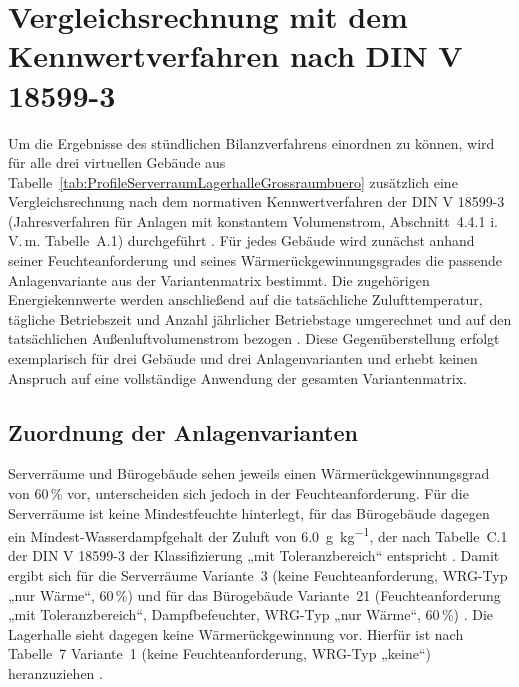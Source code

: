 \documentclass{scrreprt}
\begin{document}
\section{Vergleichsrechnung mit dem Kennwertverfahren nach DIN V 18599-3}\label{sec:Vergleichsrechnung}
Um die Ergebnisse des stündlichen Bilanzverfahrens einordnen zu
können, wird für alle drei virtuellen Gebäude aus
Tabelle~\ref{tab:ProfileServerraumLagerhalleGrossraumbuero} zusätzlich
eine Vergleichsrechnung nach dem normativen Kennwertverfahren der
DIN V 18599-3 (Jahresverfahren für Anlagen mit konstantem
Volumenstrom, Abschnitt~4.4.1 i.\,V.\,m. Tabelle~A.1) durchgeführt
\parencite{DIN185993}. Für jedes Gebäude wird zunächst anhand seiner
Feuchteanforderung und seines Wärmerückgewinnungsgrades die passende
Anlagenvariante aus der Variantenmatrix bestimmt. Die
zugehörigen Energiekennwerte werden anschließend auf die tatsächliche
Zulufttemperatur, tägliche Betriebszeit und Anzahl jährlicher
Betriebstage umgerechnet und auf den tatsächlichen
Außenluftvolumenstrom bezogen \parencite{DIN185993}. Diese
Gegenüberstellung erfolgt exemplarisch für drei Gebäude und drei
Anlagenvarianten und erhebt keinen Anspruch auf eine vollständige
Anwendung der gesamten Variantenmatrix.

\subsection{Zuordnung der Anlagenvarianten}
Serverräume und Bürogebäude sehen jeweils einen
Wärmerückgewinnungsgrad von \num{60}\,\% vor, unterscheiden sich jedoch in
der Feuchteanforderung. Für die Serverräume ist keine Mindestfeuchte
hinterlegt, für das Bürogebäude dagegen ein Mindest-Wasserdampfgehalt
der Zuluft von \SI{6.0}{\gram\per\kilo\gram}, der nach Tabelle~C.1 der
DIN V 18599-3 der Klassifizierung „mit Toleranzbereich“ entspricht
\parencite{DIN185993}. Damit ergibt sich für die Serverräume
Variante~3 (keine Feuchteanforderung, \ac{WRG}-Typ „nur Wärme“,
\num{60}\,\%) und für das Bürogebäude Variante~21 (Feuchteanforderung
„mit Toleranzbereich“, Dampfbefeuchter, \ac{WRG}-Typ „nur Wärme“,
\num{60}\,\%) \parencite{DIN185993}. Die Lagerhalle sieht dagegen keine
Wärmerückgewinnung vor. Hierfür ist nach Tabelle~7 Variante~1 (keine
Feuchteanforderung, \ac{WRG}-Typ „keine“) heranzuziehen
\parencite{DIN185993}.
\end{document}
